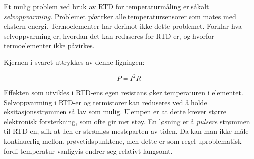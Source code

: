 

Et mulig problem ved bruk av RTD for temperaturmåling er såkalt {\it selvoppvarming}. Problemet påvirker alle temperatursensorer som mates med ekstern energi. Termoelementer har derimot ikke dette problemet. Forklar hva selvoppvarming er, hvordan det kan reduseres for RTD-er, og hvorfor termoelementer ikke påvirkes.







Kjernen i svaret uttrykkes av denne ligningen:

$$P = I^2 R$$

Effekten som utvikles i RTD-ens egen resistans øker temperaturen i elementet. Selvoppvarming i RTD-er og termistorer kan reduseres ved å holde eksitasjonsstrømmen så lav som mulig. Ulempen er at dette krever større elektronisk forsterkning, som ofte gir mer støy. En løsning er å {\it pulsere} strømmen til RTD-en, slik at den er strømløs mesteparten av tiden. Da kan man ikke måle kontinuerlig mellom prøvetidspunktene, men dette er som regel uproblematisk fordi temperatur vanligvis endrer seg relativt langsomt.









